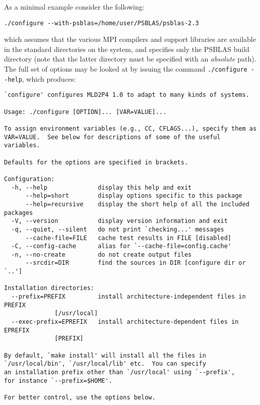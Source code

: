 As a minimal example consider the following:
\begin{verbatim}
./configure --with-psblas=/home/user/PSBLAS/psblas-2.3
\end{verbatim}
which assumes that the various MPI compilers and support libraries are
available in the standard directories on the system, and specifies
only the PSBLAS build directory (note that the latter directory must
be specified with an {\em absolute} path).
The full set of options may be looked at by issuing the command
\verb|./configure --help|, which produces:
\begin{verbatim}
`configure' configures MLD2P4 1.0 to adapt to many kinds of systems.

Usage: ./configure [OPTION]... [VAR=VALUE]...

To assign environment variables (e.g., CC, CFLAGS...), specify them as
VAR=VALUE.  See below for descriptions of some of the useful variables.

Defaults for the options are specified in brackets.

Configuration:
  -h, --help              display this help and exit
      --help=short        display options specific to this package
      --help=recursive    display the short help of all the included packages
  -V, --version           display version information and exit
  -q, --quiet, --silent   do not print `checking...' messages
      --cache-file=FILE   cache test results in FILE [disabled]
  -C, --config-cache      alias for `--cache-file=config.cache'
  -n, --no-create         do not create output files
      --srcdir=DIR        find the sources in DIR [configure dir or `..']

Installation directories:
  --prefix=PREFIX         install architecture-independent files in PREFIX
			  [/usr/local]
  --exec-prefix=EPREFIX   install architecture-dependent files in EPREFIX
			  [PREFIX]

By default, `make install' will install all the files in
`/usr/local/bin', `/usr/local/lib' etc.  You can specify
an installation prefix other than `/usr/local' using `--prefix',
for instance `--prefix=$HOME'.

For better control, use the options below.


\end{verbatim}
